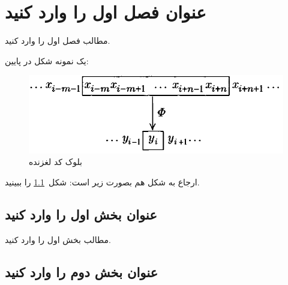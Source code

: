 %
%
%
%
\chapter{
عنوان فصل اول را وارد کنید  
}\label{chap1} 

مطالب فصل اول را وارد کنید.

یک نمونه شکل در پایین:

\begin{figure}
\centering
\includegraphics[scale=0.6]{S1}
\caption{بلوک کد لغزنده}
\label{Slide}
\end{figure}

ارجاع به شکل هم بصورت زیر است: شکل~\ref{Slide} را ببینید.

\section{
عنوان بخش اول را وارد کنید  
}\label{sec11} 

مطالب بخش اول را وارد کنید.

\section{
عنوان بخش دوم را وارد کنید  
}\label{sec12} 

